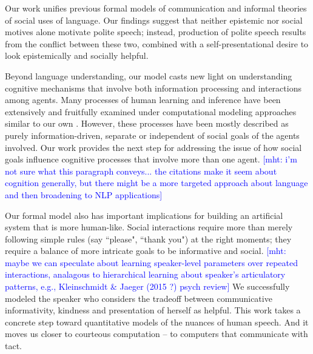 \documentclass[12pt]{article}
\newcommand{\ejy}[1]{\textcolor{Red}{[ejy: #1]}}
\newcommand{\mht}[1]{\textcolor{Blue}{[mht: #1]}}
\begin{document}


Our work unifies previous formal models of communication and informal
theories of social uses of language. Our findings suggest that neither
epistemic nor social motives alone motivate polite speech; instead,
production of polite speech results from the conflict between these two,
combined with a self-presentational desire to look epistemically
and socially helpful. 

Beyond language understanding, our model casts new light on understanding cognitive mechanisms 
that involve both information processing and interactions among agents. 
Many processes of human learning and inference
have been extensively and fruitfully examined under computational modeling approaches similar to our own
\cite{tenenbaum2011, xu2007, bonawitz2011, baker2009}. 
However, these processes have been mostly described as purely information-driven, 
separate or independent of social goals of the agents involved.
Our work provides the next step for addressing the issue of 
how social goals influence cognitive processes that involve more than one agent. 
\mht{i'm not sure what this paragraph conveys... the citations make it seem about cognition generally, but there might be a more targeted approach about language and then broadening to NLP applications}

Our formal model also has important implications for building an artificial system that is more human-like. 
Social interactions require more than merely following simple rules (say ``please", ``thank you") at the right moments; 
they require a balance of more intricate goals to be informative and social. 
\mht{maybe we can speculate about learning speaker-level parameters over repeated interactions, analagous to hierarchical learning about speaker's articulatory patterns, e.g., Kleinschmidt \& Jaeger (2015 ?) psych review}
We successfully modeled the speaker who considers the tradeoff between 
communicative informativity, kindness and presentation of herself as helpful. 
This work takes a concrete step toward quantitative models of the nuances of human speech. 
And it moves us closer to courteous computation -- to computers that communicate with tact.
\end{document}
